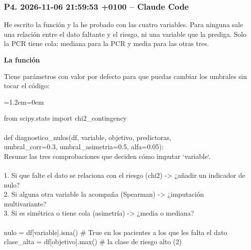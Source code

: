 \documentclass[11pt,a4paper]{article}
\newenvironment{codigo}
  {\par\smallskip\begin{list}{}{\leftmargin=1.2em\rightmargin=0em}\item\relax\ttfamily\scriptsize\raggedright}
  {\end{list}\smallskip}
\begin{document}
\subsubsection*{P4. 2026-11-06 21:59:53 +0100 -- Claude Code}
{\small
He escrito la función y la he probado con las cuatro variables. Para ninguna sale una relación entre el dato faltante y el riesgo, ni una variable que la prediga. Solo la PCR tiene cola: mediana para la PCR y media para las otras tres.

\smallskip\noindent\textbf{La función}\par
Tiene parámetros con valor por defecto para que puedas cambiar los umbrales sin tocar el código:

\begin{codigo}
from scipy.stats import chi2\_\allowbreak{}contingency \\{}
\mbox{} \\{}
def diagnostico\_\allowbreak{}nulos(df, variable, objetivo, predictoras, \\{}
\hspace*{11.44em}umbral\_\allowbreak{}corr=0.3, umbral\_\allowbreak{}asimetria=0.5, alfa=0.05): \\{}
\hspace*{2.08em}\textquotedbl{}\textquotedbl{}\textquotedbl{}Resume las tres comprobaciones que deciden cómo imputar `variable`. \\{}
\mbox{} \\{}
\hspace*{2.08em}1. Si que falte el dato se relaciona con el riesgo (chi2) -\textgreater{} ¿añadir un indicador de nulo? \\{}
\hspace*{2.08em}2. Si alguna otra variable la acompaña (Spearman)          -\textgreater{} ¿imputación multivariante? \\{}
\hspace*{2.08em}3. Si es simétrica o tiene cola (asimetría)                -\textgreater{} ¿media o mediana? \\{}
\hspace*{2.08em}\textquotedbl{}\textquotedbl{}\textquotedbl{} \\{}
\hspace*{2.08em}nulo = df[variable].isna()              \# True en los pacientes a los que les falta el dato \\{}
\hspace*{2.08em}clase\_\allowbreak{}alta = df[objetivo].max()         \# la clase de riesgo alto (2) \\{}

\end{codigo}}
\end{document}
